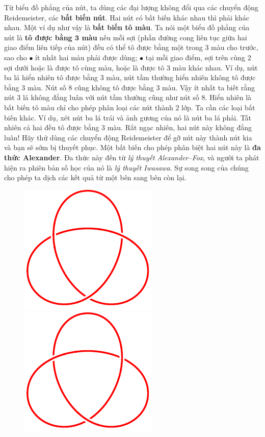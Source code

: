 \begin{multicols}{2}
\begin{figure}[H]
		\vspace*{-10pt}
	\end{figure}
	Từ biểu đồ phẳng của nút, ta dùng các đại lượng không đổi qua các chuyển động Reidemeister, các {\bf\color{duongvaotoanhoc} bất biến nút}. Hai nút có bất biến khác nhau thì phải khác nhau. Một ví dụ như vậy là {\bf\color{duongvaotoanhoc} bất biến tô màu}. Ta nói một biểu đồ phẳng của nút là {\bf\color{duongvaotoanhoc} tô được bằng $\pmb{3}$ màu} nếu mỗi sợi (phần đường cong liên tục giữa hai giao điểm liên tiếp của nút) đều có thể tô được bằng một trong $3$ màu cho trước, sao cho
	\vskip 0.05cm
	$\bullet$ ít nhất hai màu phải được dùng;
	\vskip 0.05cm
	$\bullet$ tại mỗi giao điểm, sợi trên cùng $2$ sợi dưới hoặc là được tô cùng màu, hoặc là được tô $3$ màu khác nhau.
	\vskip 0.05cm
	Ví dụ, nút ba lá hiển nhiên tô được bằng $3$ màu, nút tầm thường hiển nhiên không tô được bằng $3$ màu. Nút số $8$ cũng không tô được bằng $3$ màu. Vậy ít nhất ta biết rằng nút $3$ lá không đẳng luân với nút tầm thường cũng như nút số $8$.
	\vskip 0.05cm
	Hiển nhiên là bất biến tô màu chỉ cho phép phân loại các nút thành $2$ lớp. Ta cần các loại bất biến khác. Ví dụ, xét nút ba lá trái và ảnh gương của nó là nút ba lá phải. Tất nhiên cả hai đều tô được bằng $3$ màu. Rất ngạc nhiên, hai nút này không đẳng luân! Hãy thử dùng các chuyển động Reidemeister để gỡ nút này thành nút kia và bạn sẽ sớm bị thuyết phục. Một bất biến cho phép phân biệt hai nút này là {\bf\color{duongvaotoanhoc} đa thức Alexander}. Đa thức này đến từ {\it lý thuyết Alexander--Fox}, và người ta phát hiện ra phiên bản số học của nó là {\it lý thuyết Iwasawa}. Sự song song của chúng cho phép ta dịch các kết quả từ một bên sang bên còn lại.
	\begin{figure}[H]
		\vspace*{-10pt}
		\centering
		\captionsetup{labelformat= empty, justification=centering}
		\includegraphics[width= 0.42\linewidth]{trefoil.pdf}\quad\quad
		\includegraphics[width= 0.42\linewidth]{mirror trefoil.pdf}

\end{figure}
\end{multicols}
